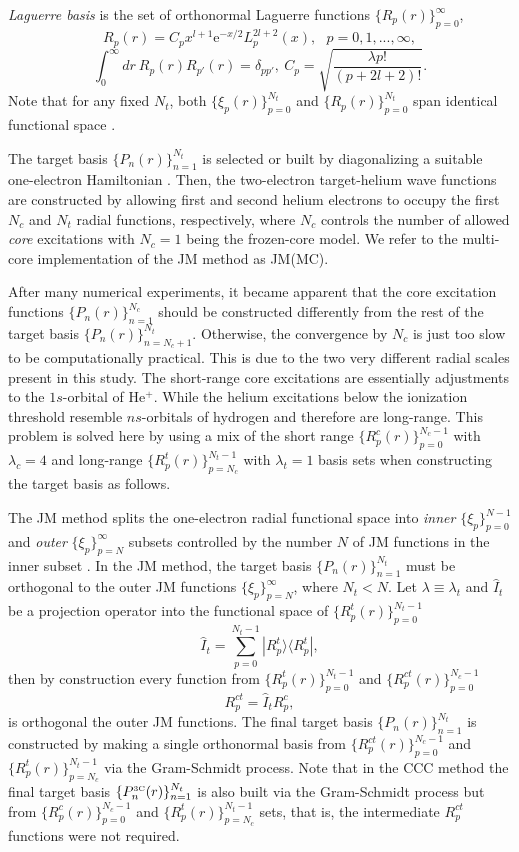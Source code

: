 \documentclass[aip
, pra
, showpacs
, aps
, twocolumn
, groupedaddress
, floatfix
]{revtex4}
\newcommand{\beq}{\begin{equation}}
\newcommand{\eeq}{\end{equation}}
\begin{document}
{\em Laguerre basis} is the set of orthonormal Laguerre functions $\{R_p(r)\}_{p=0}^\infty$,
\beq
R_p(r) = C_p x^{l+1} \mbox{e}^{-x /2}
L_p^{2l+2}(x), \ \ \ p = 0, 1, ..., \infty,
\eeq
\beq
\int_0^\infty dr \ R_p(r) R_{p'}(r) = \delta_{pp'}, \ C_p= \sqrt{\frac{\lambda p!}{ (p+2l+2)!}}.
\eeq
Note that for any fixed $N_t$, both $\{\xi_p(r)\}_{p=0}^{N_t}$ and $\{R_p(r)\}_{p=0}^{N_t}$
span identical functional space \cite{KB10p022708}.


The target basis $\{P_n(r)\}_{n=1}^{N_t}$ is selected or built by diagonalizing a suitable one-electron Hamiltonian \cite{KB10p022708, KFB11}. Then,
the two-electron target-helium wave functions are constructed by allowing first and second helium electrons to occupy the first $N_c$ and $N_t$ radial functions, respectively,
where $N_c$ controls the number of allowed {\em core} excitations with $N_c=1$ being the frozen-core model.
We refer to the multi-core implementation of the JM method as JM(MC).


After many numerical experiments, it became apparent that the core excitation functions $\{P_n(r)\}_{n=1}^{N_c}$ should be constructed differently from the rest of the target basis
$\{P_n(r)\}_{n=N_c+1}^{N_t}$. Otherwise, the convergence by $N_c$ is just too slow to be computationally practical.
This is due to the two very different radial scales present in this study.
The short-range core excitations are essentially adjustments to the $1s$-orbital of He$^+$.
While the helium excitations below the ionization threshold resemble $ns$-orbitals of hydrogen and therefore are long-range.
This problem is solved here by using a mix of the short range $\{R^c_p(r)\}_{p=0}^{N_c-1}$ with $\lambda_c=4$
and long-range $\{R^t_p(r)\}_{p=N_c}^{N_t-1}$ with $\lambda_t=1$  basis sets
when constructing the target basis as follows.


The JM method splits the one-electron radial functional space into {\em inner} $\{\xi_p\}_{p=0}^{N-1}$
and {\em outer} $\{\xi_p\}_{p=N}^\infty$
subsets controlled by the number $N$ of JM functions in the inner subset \cite{HY74p1201,BR76p1491}.
In the JM method, the target basis $\{P_n(r)\}_{n=1}^{N_t}$ must be orthogonal to the outer JM functions $\{\xi_p\}_{p=N}^\infty$, where $N_t<N$.
Let $\lambda \equiv \lambda_t$ and $\hat{I}_t$ be a projection operator into the functional space of $\{R^t_p(r)\}_{p=0}^{N_t-1}$
\beq
\hat{I}_t = \sum_{p=0}^{N_t-1} | R_p^t \rangle \langle R_p^t |,
\eeq
then by construction every function from $\{R^t_p(r)\}_{p=0}^{N_t-1}$ and  $\{R^{ct}_p(r)\}_{p=0}^{N_c-1}$
\beq
R^{ct}_p = \hat{I}_t R^{c}_p,
\eeq
is orthogonal the outer JM functions.
The final target basis $\{P_n(r)\}_{n=1}^{N_t}$ is constructed by making a single orthonormal basis from
$\{R^{ct}_p(r)\}_{p=0}^{N_c-1}$ and $\{R^t_p(r)\}_{p=N_c}^{N_t-1}$
via the Gram-Schmidt process.
Note that in the CCC method the final target basis
$\{P^{\mbox{{\tiny 3C}}}_n(r)\}_{n=1}^{N_t}$ is also built via the Gram-Schmidt process but from
$\{R^{c}_p(r)\}_{p=0}^{N_c-1}$ and $\{R^t_p(r)\}_{p=N_c}^{N_t-1}$ sets, that is, the intermediate $R^{ct}_p$ functions were not required.
\end{document}
